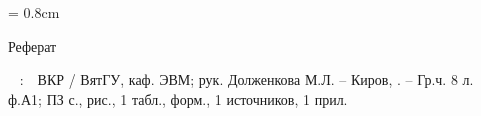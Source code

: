 
{

\topskip = 0.8cm
\begin{center}
	Реферат
\end{center}

\vspace{1em}

\authori\
\topic
:\
\mbox{\tpga}\
ВКР / ВятГУ, каф. ЭВМ; рук.
Долженкова М.Л. – Киров, \the\year. –
Гр.ч. 8 л. ф.А1;
ПЗ
 с.,
 рис.,
1 табл.,
 форм.,
1 источников,
1 прил.

\vspace{1.5em}



\vspace{1.5em}




}
